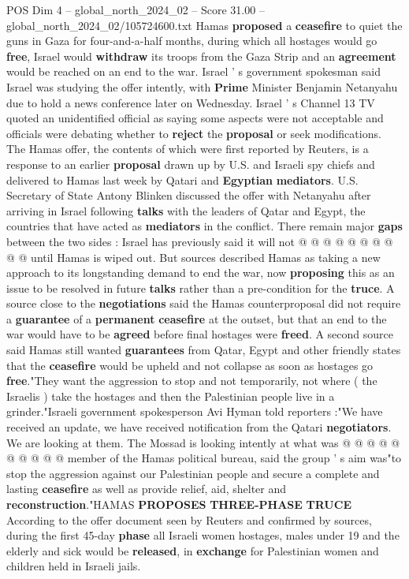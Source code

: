 \begin{textsample}{POS Dim 4 – global\_north\_2024\_02 – Score 31.00 – global\_north\_2024\_02/105724600.txt}  \label{ex:f4_pos_172}
Hamas \textbf{proposed} a \textbf{ceasefire} to quiet the guns in Gaza for four-and-a-half months, during which all hostages would go \textbf{free}, Israel would \textbf{withdraw} its troops from the Gaza Strip and an \textbf{agreement} would be reached on an end to the war.
Israel ' s government spokesman said Israel was studying the offer intently, with \textbf{Prime} Minister Benjamin Netanyahu due to hold a news conference later on Wednesday.
Israel ' s Channel 13 TV quoted an unidentified official as saying some aspects were not acceptable and officials were debating whether to \textbf{reject} the \textbf{proposal} or seek modifications.
The Hamas offer, the contents of which were first reported by Reuters, is a response to an earlier \textbf{proposal} drawn up by U.S. and Israeli spy chiefs and delivered to Hamas last week by Qatari and \textbf{Egyptian} \textbf{mediators}.
U.S.
Secretary of State Antony Blinken discussed the offer with Netanyahu after arriving in Israel following \textbf{talks} with the leaders of Qatar and Egypt, the countries that have acted as \textbf{mediators} in the conflict.
There remain major \textbf{gaps} between the two sides : Israel has previously said it will not @ @ @ @ @ @ @ @ @ @ until Hamas is wiped out.
But sources described Hamas as taking a new approach to its longstanding demand to end the war, now \textbf{proposing} this as an issue to be resolved in future \textbf{talks} rather than a pre-condition for the \textbf{truce}.
A source close to the \textbf{negotiations} said the Hamas counterproposal did not require a \textbf{guarantee} of a \textbf{permanent} \textbf{ceasefire} at the outset, but that an end to the war would have to be \textbf{agreed} before final hostages were \textbf{freed}.
A second source said Hamas still wanted \textbf{guarantees} from Qatar, Egypt and other friendly states that the \textbf{ceasefire} would be upheld and not collapse as soon as hostages go \textbf{free}."They want the aggression to stop and not temporarily, not where ( the Israelis ) take the hostages and then the Palestinian people live in a grinder."Israeli government spokesperson Avi Hyman told reporters :"We have received an update, we have received notification from the Qatari \textbf{negotiators}.
We are looking at them.
The Mossad is looking intently at what was @ @ @ @ @ @ @ @ @ @ member of the Hamas political bureau, said the group ' s aim was"to stop the aggression against our Palestinian people and secure a complete and lasting \textbf{ceasefire} as well as provide relief, aid, shelter and \textbf{reconstruction}."HAMAS \textbf{PROPOSES} \textbf{THREE-PHASE} \textbf{TRUCE} According to the offer document seen by Reuters and confirmed by sources, during the first 45-day \textbf{phase} all Israeli women hostages, males under 19 and the elderly and sick would be \textbf{released}, in \textbf{exchange} for Palestinian women and children held in Israeli jails.

\end{textsample}
